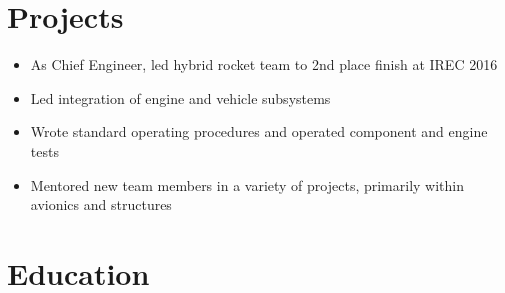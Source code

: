 \documentclass{resume}
\begin{document}
\section{Projects}
\begin{itemize}
    \item As Chief Engineer, led hybrid rocket team to 2nd place finish at IREC 2016
    \item Led integration of engine and vehicle subsystems
    \item Wrote standard operating procedures and operated component and engine tests
    \item Mentored new team members in a variety of projects, primarily within avionics and structures
\end{itemize}

\section{Education}
\end{document}
